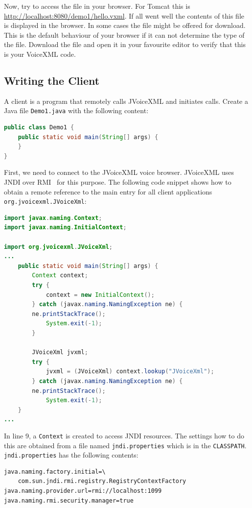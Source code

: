 \documentclass[11pt,a4paper]{article}
\begin{document}
Now, try to access the file in your browser. For Tomcat this is
\url{http://localhost:8080/demo1/hello.vxml}. If all went well the
contents of this file is displayed in the browser. In some cases the file
might be offered for download. This is the default behaviour of your browser if
it can not determine the type of the file. Download the file and open it in your
favourite editor to verify that this is your VoiceXML code.

\subsection{Writing the Client}

A client is a program that remotely calls JVoiceXML and initiates calls. Create 
a Java file \texttt{Demo1.java} with the following content:

\begin{lstlisting}[language=Java]
public class Demo1 {
    public static void main(String[] args) {
    }
}
\end{lstlisting}

First, we need to connect to the JVoiceXML voice browser. JVoiceXML
uses JNDI over RMI~\cite{sun:rmi,sun:rmi_jndi} for this purpose. 
The following code snippet
shows how to obtain a remote reference to the main entry for
all client applications \texttt{org.jvoicexml.JVoiceXml}:

\begin{lstlisting}[language=Java]
import javax.naming.Context;
import javax.naming.InitialContext;

import org.jvoicexml.JVoiceXml;
...
    public static void main(String[] args) {
        Context context;
        try {
            context = new InitialContext();
        } catch (javax.naming.NamingException ne) {
	    ne.printStackTrace();
            System.exit(-1);
        }

        JVoiceXml jvxml;
        try {
            jvxml = (JVoiceXml) context.lookup("JVoiceXml");
        } catch (javax.naming.NamingException ne) {
	    ne.printStackTrace();
            System.exit(-1);
    }
...
\end{lstlisting}

In line 9, a \texttt{Context} is created to access JNDI resources.
The settings how to do this are obtained from a file named
\texttt{jndi.properties} which is in the \texttt{CLASSPATH}.
\texttt{jndi.properties} has the following contents:

\begin{lstlisting}
java.naming.factory.initial=\
    com.sun.jndi.rmi.registry.RegistryContextFactory
java.naming.provider.url=rmi://localhost:1099
java.naming.rmi.security.manager=true
\end{lstlisting}
\end{document}
